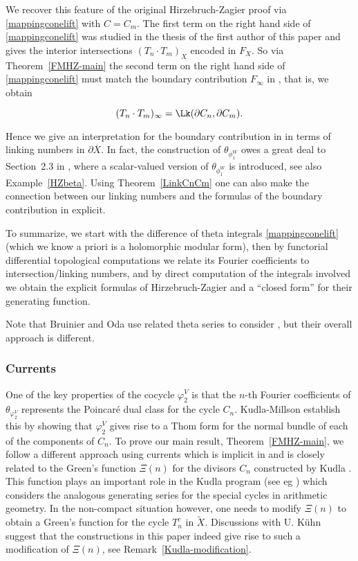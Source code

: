 We recover this feature of the original Hirzebruch-Zagier proof via
\eqref{mappingconelift} with $C=C_m$. The first term on the right
hand side of \eqref{mappingconelift} was studied in the thesis of
the first author of this paper \cite{FCompo} and gives the interior
intersections $(T_n \cdot T_m)_X$ encoded in $F_X$. So via
Theorem~\ref{FMHZ-main} the second term on the right hand side of
\eqref{mappingconelift} must match the boundary contribution
$F_{\infty}$ in \cite{HZ}, that is, we obtain
\begin{theorem}
\[
({T}_n \cdot {T}_m)_{\infty} = \Lk( \partial C_n, \partial C_m).
\]
\end{theorem}
Hence we give an interpretation for the boundary contribution in
\cite{HZ} in terms of linking numbers in $\partial \overline{X}$.
In fact, the construction of $\theta_{\phi_1^W}$ owes a great deal
to Section~2.3 in \cite{HZ}, where a scalar-valued version of
$\theta_{\phi_1^W}$ is introduced, see also Example~\ref{HZbeta}.
Using Theorem~\ref{LinkCnCm} one can also make the connection between
our linking numbers and the formulas of the boundary contribution
in \cite{HZ} explicit.

To summarize, we start with the difference of theta integrals
\eqref{mappingconelift} (which we know a priori is a holomorphic
modular form), then by functorial differential topological computations
we relate its Fourier coefficients to intersection/linking numbers,
and by direct computation of the integrals involved we obtain the
explicit formulas of Hirzebruch-Zagier and a ``closed form'' for
their generating function.

Note that Bruinier \cite{B-123} and Oda \cite{Oda} use related theta
series to consider \cite{HZ}, but their overall approach is different.


\subsubsection*{Currents}

One of the key properties of the cocycle $\varphi^V_2$ is that
the $n$-th Fourier coefficients of $\theta_{\varphi^V_{2}}$
represents the Poincar\' e dual class for the cycle $C_n$.
Kudla-Millson establish this by showing that $\varphi^V_2$
gives rise to a Thom form for the normal bundle of each of
the components of $C_n$. To prove our main result,
Theorem~\ref{FMHZ-main}, we follow a different approach
using currents which is implicit in \cite{BFDuke} and is
closely related to the Green's function $\Xi(n)$ for the
divisors $C_n$ constructed by Kudla \cite{KAnn97,KBforms}.
This function plays an important role in the Kudla program
(see eg \cite{Kmsri}) which considers the analogous generating
series for the special cycles in arithmetic geometry. In
the non-compact situation however, one needs to modify 
$\Xi(n)$ to obtain a Green's function for the cycle $T_n^c$
in $\tilde{X}$. Discussions with U. K\"uhn suggest that the
constructions in this paper indeed give rise to such a 
modification of $\Xi(n)$, see Remark~\ref{Kudla-modification}.


